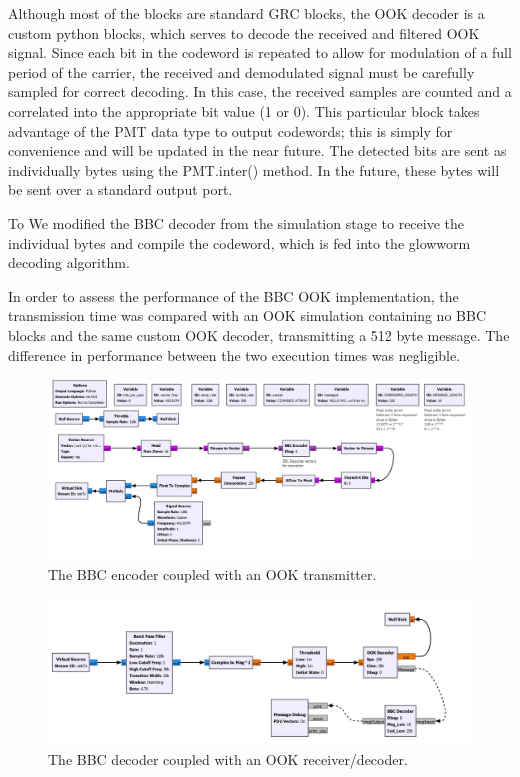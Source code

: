 \documentclass[conference]{IEEEtran}
\begin{document}
Although most of the blocks are standard GRC blocks, the OOK decoder is a custom python blocks, which serves to decode the received and filtered OOK signal. Since each bit in the codeword is repeated to allow for modulation of a full period of the carrier, the received and demodulated signal must be carefully sampled for correct decoding. In this case, the received samples are counted and a correlated into the appropriate bit value (1 or 0). This particular block takes advantage of the PMT data type to output codewords; this is simply for convenience and will be updated in the near future. The detected bits are sent as individually bytes using the PMT.inter() method. In the future, these bytes will be sent over a standard output port. 

To We modified the BBC decoder from the simulation stage to receive the individual bytes and compile the codeword, which is fed into the glowworm decoding algorithm. 

In order to assess the performance of the BBC OOK implementation, the transmission time was compared with an OOK simulation containing no BBC blocks and the same custom OOK decoder, transmitting a 512 byte message. The difference in performance between the two execution times was negligible. 


\begin{figure}
    \centering
    \includegraphics[scale=0.25]{./figures/bbc_ook_1}
    \caption{The BBC encoder coupled with an OOK transmitter.}
    \label{fig:bbc_ook_tx}
\end{figure}


\begin{figure}
    \centering
    \includegraphics[scale=0.25]{./figures/bbc_ook_2}
    \caption{The BBC decoder coupled with an OOK receiver/decoder.}
    \label{fig:bbc_ook_rx}
\end{figure}
\end{document}
